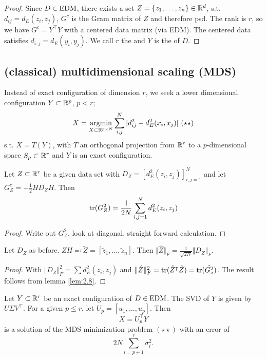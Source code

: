 \begin{proof}
    Since $D\in\text{EDM}$, there exists a set $Z=\{z_1,\dots,z_n\}\in\mathbb{R}^d$, s.t. $d_{ij}=d_E(z_i,z_j)$,
    $G^c$ is the Gram matrix of $Z$ and therefore psd. The rank is $r$, so we have $G^c=Y^\intercal Y$ with a centered 
    data matrix (via EDM). The centered data satisfies $d_{i,j}=d_E(y_i,y_j)$. We call $r$ the  and 
    $Y$ is the  of $D$.
\end{proof}

\subsection{(classical) multidimensional scaling (MDS)}

Instead of exact configuration of dimension $r$, we seek a lower dimensional configuration $Y\subset\mathbb{R}^p$, $p<r$;
\[X=\operatorname*{\text{argmin}}_{X\subset\mathbb{R}^{p\times N}}\sum_{i,j}^N |d_{ij}^2-d_E^2(x_i,x_j)|\text{ } (\star\star)\]
s.t. $X=T(Y)$, with $T$ an orthogonal projection from $\mathbb{R}^r$ to a $p$-dimensional space $S_p\subset\mathbb{R}^r$ and $Y$ is an exact configuration. 

\begin{lemma}\label{lem:2.8}
    Let $Z\subset\mathbb{R}^r$ be a given data set with $D_Z=[d_E^2(z_i,z_j)]_{i,j=1}^N$ and let $G_Z^c=-\frac{1}{2}HD_ZH$.
    Then \[\text{tr}(G_Z^2)=\frac{1}{2N}\sum_{i,j=1}^N d_E^2(z_i,z_j)\]
\end{lemma}

\begin{proof}
    Write out $G_Z^2$, look at diagonal, straight forward calculation.
\end{proof}

\begin{lemma}\label{lem:2.9}
    Let $D_Z$ as before. $ZH\eqqcolon\tilde{Z}=[\tilde{z}_1,\dots,\tilde{z}_n]$. Then $\Vert \hat{Z}\Vert_F=\frac{1}{\sqrt{2N}}\Vert D_Z\Vert_F$.
\end{lemma}

\begin{proof}
    With $\Vert D_Z \Vert_F^2=\sum d_E^2(z_i,z_j)$ and $\Vert\hat{Z}\Vert_F^2=\text{tr}(\hat{Z}^\intercal \hat{Z})=\text{tr}(\hat{G_z^2})$. The result follows from lemma \ref{lem:2.8}.
\end{proof}

\begin{theorem}\label{thm:2.10}
    Let $Y\subset\mathbb{R}^r$ be an exact configuration of $D\in\text{EDM}$. The SVD of $Y$ is given by $U\Sigma V^\intercal$. For a given $p\leq r$, let 
    $U_p=[u_1,\dots,u_p]$. Then 
    \[X=U_p^\intercal Y\] 
    is a solution of the MDS minimization problem $(\star\star)$ with an error of \[2N\sum_{i=p+1}^r\sigma_i^2.\]
\end{theorem}


